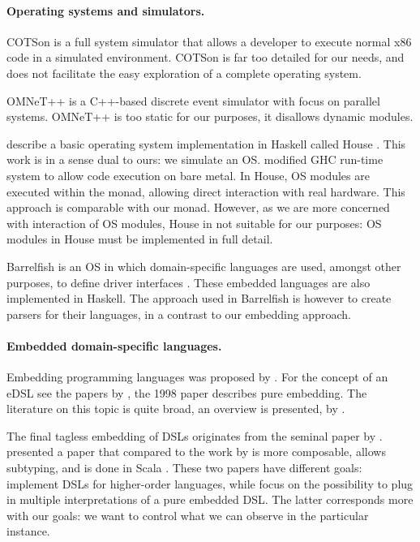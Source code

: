 \paragraph{Operating systems and simulators.}
COTSon \cite{cotson} is a full system simulator that allows a developer to execute normal x86 code in a simulated environment.
COTSon is far too detailed for our needs, and does not facilitate the easy exploration of a complete operating system.

OMNeT++ \cite{omnet} is a C++-based discrete event simulator with focus on parallel systems. OMNeT++ is too static for our purposes, it disallows dynamic modules.

\citeauthor{house} describe a basic operating system implementation in Haskell called House \cite{house}.
This work is in a sense dual to ours: we simulate an OS.
\citeauthor{house} modified GHC run-time system to allow code execution on bare metal.
In House, OS modules are executed within the  monad, allowing direct interaction with real hardware.
This approach is comparable with our  monad.
However, as we are more concerned with interaction of OS modules, House in not suitable for our purposes:  OS modules in House must be implemented in full detail.

Barrelfish \cite{Baumann:2009:MNO:1629575.1629579} is an OS in which domain-specific languages are used, amongst other purposes, to define driver interfaces \cite{barrelfish}.
These embedded languages are also implemented in Haskell.
The approach used in Barrelfish is however to create parsers for their languages, in a contrast to our embedding approach.


\paragraph{Embedded domain-specific languages.}
Embedding programming languages was proposed by \citeauthor{Landin:1966:NPL:365230.365257} \cite{Landin:1966:NPL:365230.365257}.
For the concept of an eDSL see the papers by \citeauthor{hudak1} \cite{hudak1,hudak2}, the 1998 paper describes pure embedding.
The literature on this topic is quite broad, an overview is presented, \eg by \citeauthor{dsl-survey} \cite{dsl-survey}.

The final tagless embedding of DSLs originates from the seminal paper by \citeauthor{final_tagless_embedding} \cite{final_tagless_embedding}.
\citeauthor{Hofer:2008:PED:1449913.1449935} \cite{Hofer:2008:PED:1449913.1449935} presented a paper that compared to the work by \citeauthor{final_tagless_embedding} \cite{final_tagless_embedding} is more composable, allows subtyping, and is done in Scala \cite{odersky2008programming}.
These two papers have different goals: \citeauthor{final_tagless_embedding} implement DSLs for higher-order languages, while \citeauthor{Hofer:2008:PED:1449913.1449935} focus on the possibility to plug in multiple interpretations of a pure embedded DSL.
The latter corresponds more with our goals: we want to control  what we can observe in the particular instance.


